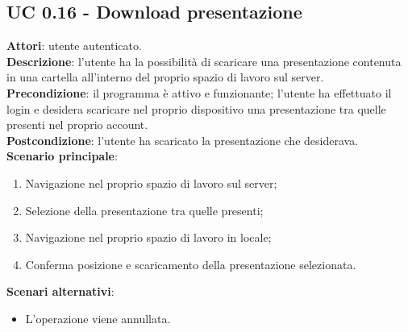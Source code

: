 \subsection{UC 0.16 - Download presentazione}{
	\label{uc0.16}
	\textbf{Attori}: utente autenticato.	\\
	\textbf{Descrizione}: l'utente ha la possibilità di scaricare una presentazione contenuta in una cartella all'interno del proprio spazio di lavoro sul server. \\
	\textbf{Precondizione}: il programma è attivo e funzionante; l'utente ha effettuato il login e desidera scaricare nel proprio dispositivo una presentazione tra quelle presenti nel proprio account.	\\
	\textbf{Postcondizione}: l'utente ha scaricato la presentazione che desiderava.	\\
	\textbf{Scenario principale}:
	\begin{enumerate}
		\item Navigazione nel proprio spazio di lavoro sul server;
		\item Selezione della presentazione tra quelle presenti;
		\item Navigazione nel proprio spazio di lavoro in locale;
		\item Conferma posizione e scaricamento della presentazione selezionata.
	\end{enumerate}
	\textbf{Scenari alternativi}: 
	\begin{itemize}
		\item L'operazione viene annullata.
	\end{itemize}
	}